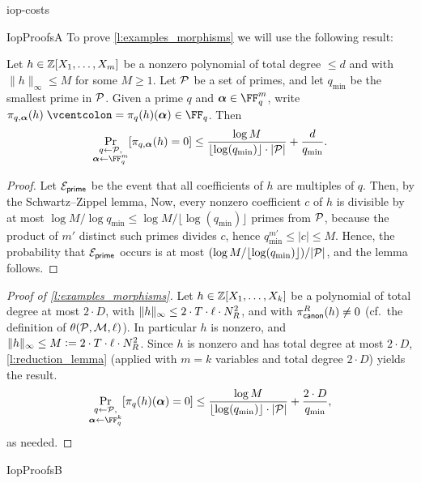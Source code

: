 \begin{lncsappendix}{iop-costs}
\begin{lncsmove}{IopProofsA}
 To prove \cref{l:examples_morphisms} we will use the following result:
\begin{lemma}\label{l:reduction_lemma}
Let $h\in \mathbb{Z}[X_1, \ldots, X_m]$ be a nonzero polynomial of total degree $\leq d$ and with $\lVert h\rVert_\infty\leq M$ for some $M\geq 1$. Let $\mathcal{P}$ be a set of primes, and let $q_{\min}$ be the smallest prime in $\mathcal{P}$. Given a prime $q$ and $\bm{\alpha}\in \FF_q^m$, write $\pi_{q,\bm{\alpha}}(h)\defeq \pi_q(h)(\bm{\alpha})\in \FF_q$. Then 
%
$$
\Pr_{\substack{q\gets \cP,\\\bm{\alpha} \gets \FF_q^m}}[\pi_{q,\bm{\alpha}}(h)=0] \leq \frac{\log M}{\lfloor\log(q_{\min})\rfloor\cdot |\cP|} + \frac{d}{q_{\min}}.
$$
\end{lemma}
\begin{proof}
Let $\mathcal{E}_{\mathsf{prime}}$ be the event that all coefficients of $h$ are  multiples of $q$. Then, by the Schwartz--Zippel lemma, 
%
Now, every nonzero coefficient $c$ of $h$ is divisible by at most $\log M/\log q_{\min}\leq \log M/\lfloor\log(q_{\min})\rfloor$ primes from $\mathcal{P}$, because the product of $m'$ distinct such primes divides $c$, hence $q_{\min}^{m'}\leq |c|\leq M$. Hence, the probability that $\mathcal{E}_{\mathsf{prime}}$ occurs is at most $(\log M/\lfloor\log(q_{\min})\rfloor)/|\mathcal{P}|$, and the lemma follows.
%
\end{proof}



\begin{proof}[Proof of \cref{l:examples_morphisms}]
Let $h\in \mathbb{Z}[X_1,\ldots, X_{k}]$ be a polynomial of total degree at most $2\cdot D$, with $\lVert h\rVert_\infty\leq 2\cdot T\cdot \ell\cdot N_R^2$, and with $\pi_{\mathsf{canon}}^{R}(h)\neq 0$ (cf.\ the definition of $\theta(\mathcal{P},\mathcal{M},\ell)$). In particular $h$ is nonzero, and $\lVert h\rVert_\infty\leq M{\;\vcentcolon=\;} 2\cdot T\cdot \ell\cdot N_R^2$. Since $h$ is nonzero and has total degree at most $2\cdot D$, \cref{l:reduction_lemma} (applied with $m=k$ variables and total degree $2\cdot D$) yields \iflncs the result.\else $$\Pr_{\substack{q\gets \cP,\\ \bm{\alpha} \gets \FF_q^{k}}}[\pi_q(h)(\bm{\alpha})=0] \leq \frac{\log M}{\lfloor\log(q_{\min})\rfloor\cdot |\cP|} + \frac{2\cdot D}{q_{\min}},$$ as needed.\fi
%
\end{proof}
\end{lncsmove}
\begin{lncsmove}{IopProofsB}



\end{lncsmove}
\end{lncsappendix}
